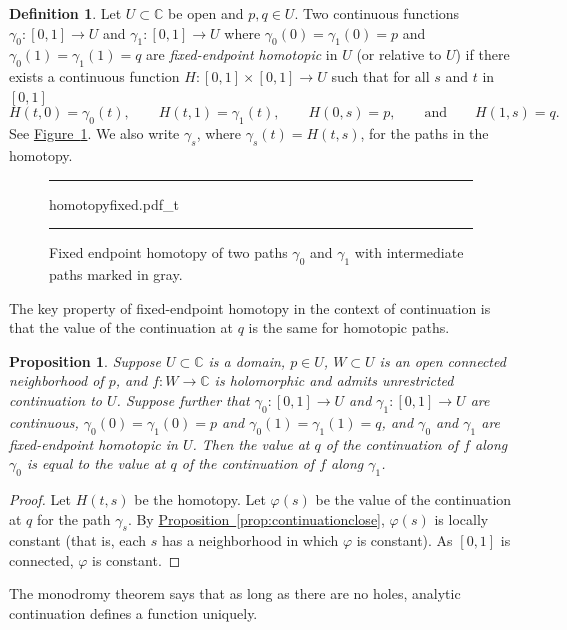 \documentclass[12pt,openany]{book}
\newcommand{\C}{{\mathbb{C}}}
\newcommand{\myindex}[1]{#1\index{#1}}
\theoremstyle{plain}
\newtheorem{prop}[thm]{Proposition}
\theoremstyle{remark}
\theoremstyle{definition}
\newtheorem{defn}[thm]{Definition}
\newenvironment{myfig}{%
\begin{figure}[h!t]
\noindent\rule{\textwidth}{0.5pt}\vspace{12pt}\par\centering}%
{\par\noindent\rule{\textwidth}{0.5pt}
\end{figure}}
\theoremstyle{exercise}
\theoremstyle{example}
\newcommand{\figureref}[1]{\hyperref[#1]{Figure~\ref*{#1}}}
\newcommand{\propref}[1]{\hyperref[#1]{Proposition~\ref*{#1}}}
\begin{document}
\begin{defn}
Let $U \subset \C$ be open and $p,q \in U$.
Two continuous functions
$\gamma_0 \colon [0,1] \to U$ and
$\gamma_1 \colon [0,1] \to U$ where
$\gamma_0(0)=\gamma_1(0)=p$
and
$\gamma_0(1)=\gamma_1(1)=q$
are
\emph{\myindex{fixed-endpoint homotopic}} in $U$
(or relative to $U$) if there exists a continuous function
$H \colon [0,1] \times [0,1] \to U$ such that
for all $s$ and $t$ in $[0,1]$
\begin{equation*}
H(t,0) = \gamma_0(t), \qquad
H(t,1) = \gamma_1(t), \qquad
H(0,s) = p, \qquad
\text{and} \qquad
H(1,s) = q .
\end{equation*}
See \figureref{fig:homotopyfixed}.
We also write $\gamma_s$, where $\gamma_s(t) = H(t,s)$, for the paths in the homotopy.
\end{defn}

\begin{myfig}
{homotopyfixed.pdf_t}
\caption{Fixed endpoint homotopy of two paths $\gamma_0$ and
$\gamma_1$ with intermediate paths marked in gray.\label{fig:homotopyfixed}}
\end{myfig}

The key property of fixed-endpoint homotopy in the context of continuation is that 
the value of the continuation at $q$ is the same for homotopic paths.

\begin{prop}
\pagebreak[2]
Suppose $U \subset \C$ is a domain,
$p \in U$,
$W \subset U$ is an open connected neighborhood of $p$,
and $f \colon W \to \C$ is holomorphic and admits unrestricted continuation
to $U$.  Suppose further that
$\gamma_0 \colon [0,1] \to U$ and
$\gamma_1 \colon [0,1] \to U$ are continuous, $\gamma_0(0)=\gamma_1(0)=p$
and
$\gamma_0(1)=\gamma_1(1)=q$, and $\gamma_0$ and $\gamma_1$ are fixed-endpoint
homotopic in $U$.
Then the value at $q$ of the continuation of $f$ along $\gamma_0$ is equal to the
value at $q$ of the continuation of $f$ along $\gamma_1$.
\end{prop}

\begin{proof}
Let $H(t,s)$ be the homotopy.
Let $\varphi(s)$ be the value of the continuation at $q$ for the path
$\gamma_s$.
By \propref{prop:continuationclose}, $\varphi(s)$ is locally constant (that
is, each $s$ has a neighborhood in which $\varphi$ is constant).  
As $[0,1]$ is connected, $\varphi$ is constant.
\end{proof}

The monodromy theorem says that as long as there are
no holes, analytic continuation defines a function uniquely.
\end{document}
